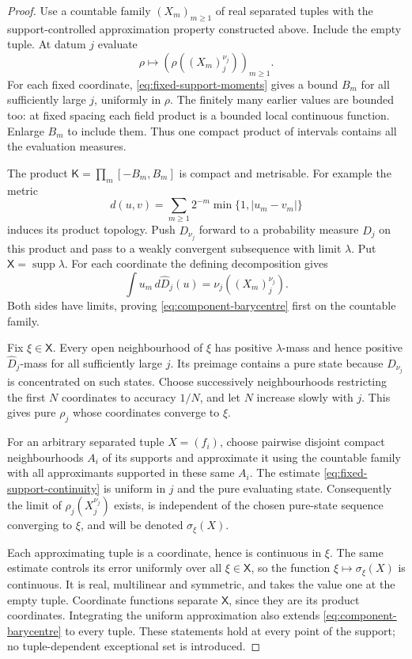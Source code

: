 \documentclass[11pt,letterpaper,reqno]{amsart}
\theoremstyle{definition}
\theoremstyle{remark}
\begin{document}
\begin{proof}
Use a countable family \((X_m)_{m\ge1}\) of real separated
tuples with the support-controlled approximation property
constructed above. Include the empty tuple. At datum \(j\)
evaluate
\[
 \rho\longmapsto
                   (\rho((X_m)_j^{\nu_j}))_{m\ge1}.
\]
For each fixed coordinate, \eqref{eq:fixed-support-moments}
gives a bound \(B_m\) for all sufficiently large \(j\),
uniformly in \(\rho\). The finitely many earlier values
are bounded too: at fixed spacing each field product
is a bounded local continuous function. Enlarge \(B_m\)
to include them. Thus one compact product of intervals
contains all the evaluation measures.


The product $\mathsf K=\prod_m[-B_m,B_m]$ is compact and metrisable.
For example the metric
\[
 d(u,v)=\sum_{m\ge1}2^{-m}
       \min\{1,|u_m-v_m|\}
\]
induces its product topology. Push $D_{\nu_j}$ forward to a probability
measure $\widehat D_j$ on this product and pass to a weakly convergent
subsequence with limit $\lambda$. Put $\mathsf X=\operatorname{supp}\lambda$.
For each coordinate the defining decomposition gives
\[
 \int u_m\,d\widehat D_j(u)
       =\nu_j((X_m)_j^{\nu_j}).
\]
Both sides have limits, proving \eqref{eq:component-barycentre} first
on the countable family.

Fix $\xi\in\mathsf X$. Every open neighbourhood of $\xi$ has positive
$\lambda$-mass and hence positive $\widehat D_j$-mass for all
sufficiently large $j$. Its preimage contains a pure state because
$D_{\nu_j}$ is concentrated on such states. Choose successively
neighbourhoods restricting the first $N$ coordinates to accuracy
$1/N$, and let $N$ increase slowly with $j$. This gives pure $\rho_j$
whose coordinates converge to $\xi$.

For an arbitrary separated tuple \(X=(f_i)\), choose
pairwise disjoint compact neighbourhoods \(A_i\) of its
supports and approximate it using the countable family
with all approximants supported in these same \(A_i\).
The estimate \eqref{eq:fixed-support-continuity} is
uniform in \(j\) and the pure evaluating state.
Consequently the limit of \(\rho_j(X_j^{\nu_j})\)
exists, is independent of the chosen pure-state
sequence converging to \(\xi\), and will be denoted
\(\sigma_\xi(X)\).

Each approximating tuple is a coordinate, hence is
continuous in \(\xi\). The same estimate controls its
error uniformly over all \(\xi\in\mathsf X\), so the
function \(\xi\mapsto\sigma_\xi(X)\) is continuous.
It is real, multilinear and symmetric, and takes
the value one at the empty tuple. Coordinate
functions separate \(\mathsf X\), since they are
its product coordinates. Integrating the uniform
approximation also extends
\eqref{eq:component-barycentre} to every tuple.
These statements hold at every point of the support;
no tuple-dependent exceptional set is introduced.


\end{proof}
\end{document}
